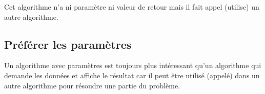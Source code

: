 			Cet algorithme n'a ni paramètre ni valeur de retour
			mais il fait appel (utilise) un autre algorithme.

		\subsection{Préférer les paramètres}
			
			Un algorithme avec paramètres 
			est toujours plus intéressant
			qu'un algorithme qui demande les données
			et affiche le résultat
			car il peut être utilisé (appelé) dans un autre algorithme
			pour résoudre une partie du problème.
			
